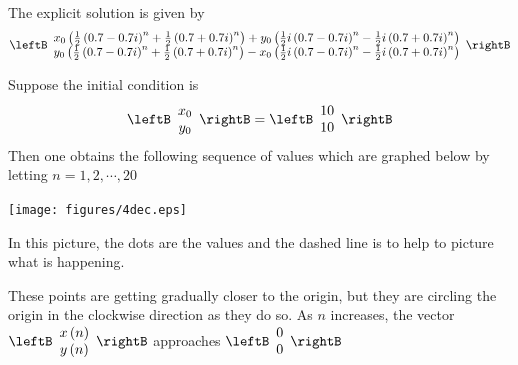 \begin{solution}
The explicit solution is given by
\begin{equation*}
\leftB
\begin{array}{c}
x_{0}\left( \vspace{0.05in}\frac{1}{2}\left( 0.7-0.7i \right) ^{n}+\vspace{0.05in}\frac{1}{2}
\left( 0.7+0.7i\right) ^{n}\right) + \allowbreak y_{0}\left( \vspace{0.05in}\frac{1}{2}
i\left( 0.7-0.7i\right) ^{n}-\frac{1}{2}i \left(
0.7+0.7i\right)  ^{n}\right) \\
y_{0}\left( \vspace{0.05in}\frac{1}{2} \left( 0.7-0.7i \right) ^{n}+\vspace{0.05in}\frac{1}{2}
\left( 0.7+0.7i\right) ^{n}\right) -  x_{0}\left( \vspace{0.05in}\frac{1}{2}
i\left( 0.7-0.7i\right) ^{n}-\vspace{0.05in}\frac{1}{2}i\left( 
0.7+0.7i\right) ^{n}\right)
\end{array}
\rightB
\end{equation*}

Suppose the initial condition is
\begin{equation*}
\leftB
\begin{array}{c}
x_{0} \\
y_{0}
\end{array}
\rightB =\leftB
\begin{array}{r}
10 \\
10
\end{array}
\rightB
\end{equation*}
Then one obtains the following sequence of values which are graphed below by
letting $n=1,2,\cdots ,20$

\begin{center}
\texttt{[image: figures/4dec.eps]}
\end{center}

In this picture, the dots are the values and the dashed line is to help to
picture what is happening.

These points are getting gradually closer to the origin, but they are
circling the origin in the clockwise direction as they do so. As $n$ increases,
the vector  $\leftB
\begin{array}{c}
x\left( n\right) \\
y\left( n\right)
\end{array}
\rightB$ approaches $ \leftB
\begin{array}{r}
0 \\
0
\end{array}
\rightB$
\end{solution}

